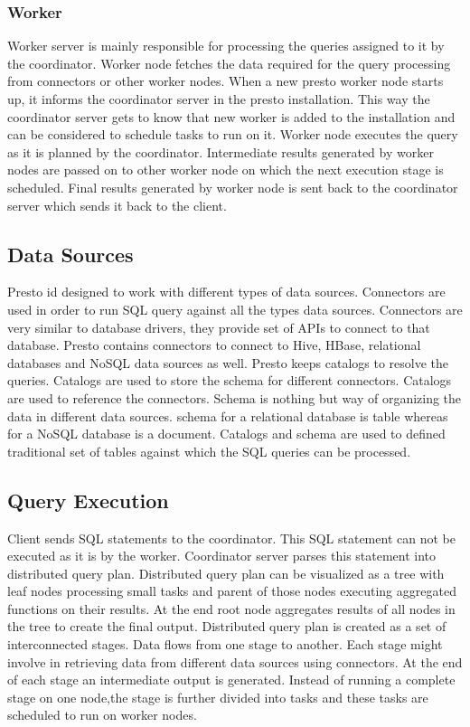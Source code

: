 \subsubsection{Worker}
Worker server is mainly responsible for processing the queries assigned to it
by the coordinator. Worker node fetches the data required for the query
processing from connectors or other worker nodes. When a new presto worker node
starts up, it informs the coordinator server in the presto installation. This
way the coordinator server gets to know that new worker is added to the
installation and can be considered to schedule tasks to run on it.
Worker node executes the query as it is planned by the coordinator. Intermediate
results generated by worker nodes are passed on to other worker node on which
the next execution stage is scheduled. Final results generated by worker node is
sent back to the coordinator server which sends it back to the client.

\subsection{Data Sources}
Presto id designed to work with different types of data sources. Connectors are
used in order to run SQL query against all the types data sources. Connectors
are very similar to database drivers, they provide set of APIs to connect to
that database. Presto contains connectors to connect to Hive, HBase, relational
databases and NoSQL data sources as well. Presto keeps catalogs to resolve the
queries. Catalogs are used to store the schema for different connectors.
Catalogs are used to reference the connectors. Schema is nothing but way of
organizing the data in different data sources. schema for a relational database
is table whereas for a NoSQL database is a document. Catalogs and schema are
used to defined traditional set of tables against which the SQL queries can be
processed.

\subsection{Query Execution}
Client sends SQL statements to the coordinator. This SQL statement can not be
executed as it is by the worker. Coordinator server parses this statement into
distributed query plan. Distributed query plan can be visualized as a tree with
leaf nodes processing small tasks and parent of those nodes executing aggregated
functions on their results. At the end root node aggregates results of all
nodes in the tree to create the final output.
Distributed query plan is created as a set of interconnected stages. Data flows
from one stage to another. Each stage might involve in retrieving data from
different data sources using connectors. At the end of each stage an
intermediate output is generated. Instead of running a complete stage on one
node,the stage is further divided into tasks and these tasks are scheduled to
run on worker nodes.

